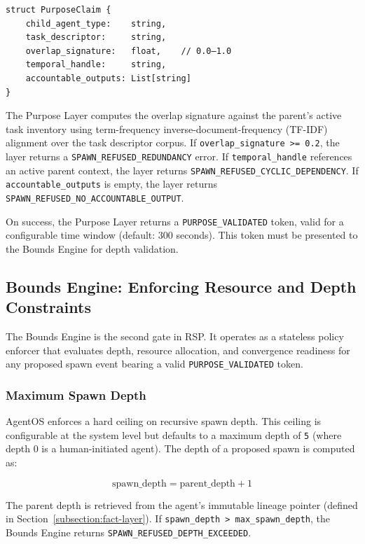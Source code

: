 \begin{verbatim}
struct PurposeClaim {
    child_agent_type:    string,
    task_descriptor:     string,
    overlap_signature:   float,    // 0.0–1.0
    temporal_handle:     string,
    accountable_outputs: List[string]
}
\end{verbatim}

The Purpose Layer computes the overlap signature against the parent's active task inventory using term-frequency inverse-document-frequency (TF-IDF) alignment over the task descriptor corpus. If \texttt{overlap\_signature >= 0.2}, the layer returns a \texttt{SPAWN\_REFUSED\_REDUNDANCY} error. If \texttt{temporal\_handle} references an active parent context, the layer returns \texttt{SPAWN\_REFUSED\_CYCLIC\_DEPENDENCY}. If \texttt{accountable\_outputs} is empty, the layer returns \texttt{SPAWN\_REFUSED\_NO\_ACCOUNTABLE\_OUTPUT}.

On success, the Purpose Layer returns a \texttt{PURPOSE\_VALIDATED} token, valid for a configurable time window (default: 300 seconds). This token must be presented to the Bounds Engine for depth validation.

\subsection{Bounds Engine: Enforcing Resource and Depth Constraints}
\label{subsection:bounds-engine}

The Bounds Engine is the second gate in RSP. It operates as a stateless policy enforcer that evaluates depth, resource allocation, and convergence readiness for any proposed spawn event bearing a valid \texttt{PURPOSE\_VALIDATED} token.

\subsubsection{Maximum Spawn Depth}
\label{subsubsection:maximum-spawn-depth}

AgentOS enforces a hard ceiling on recursive spawn depth. This ceiling is configurable at the system level but defaults to a maximum depth of \texttt{5} (where depth 0 is a human-initiated agent). The depth of a proposed spawn is computed as:

\begin{equation}
    \text{spawn\_depth} = \text{parent\_depth} + 1
\end{equation}

The parent depth is retrieved from the agent's immutable lineage pointer (defined in Section~\ref{subsection:fact-layer}). If \texttt{spawn\_depth > max\_spawn\_depth}, the Bounds Engine returns \texttt{SPAWN\_REFUSED\_DEPTH\_EXCEEDED}.

